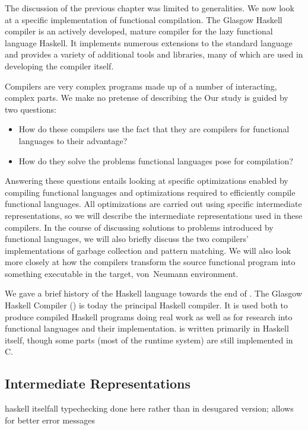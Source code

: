 \label{casestudy}
The discussion of the previous chapter was limited to generalities. We now look at a specific implementation of functional compilation. The Glasgow Haskell compiler is an actively developed, mature compiler for the lazy functional language Haskell. It implements numerous extensions to the standard language and provides a variety of additional tools and libraries, many of which are used in developing the compiler itself.

Compilers are very complex programs made up of a number of interacting, complex parts. We make no pretense of describing the \GHC[long]  Our study is guided by two questions:
\begin{itemize}
\item
How do these compilers use the fact that they are compilers for functional languages to their advantage?

\item
How do they solve the problems functional languages pose for compilation?
\end{itemize}

Answering these questions entails looking at specific optimizations enabled by compiling functional languages and optimizations required to efficiently compile functional languages. All optimizations are carried out using specific intermediate representations, so we will describe the intermediate representations used in these compilers. In the course of discussing solutions to problems introduced by functional languages, we will also briefly discuss the two compilers' implementations of garbage collection and pattern matching. We will also look more closely at how the compilers transform the source functional program into something executable in the target, von~Neumann environment.

We gave a brief history of the Haskell language towards the end of . The Glasgow Haskell Compiler (\GHC{}) is today the principal Haskell compiler. It is used both to produce compiled Haskell programs doing real work as well as for research into functional languages and their implementation. \GHC is written primarily in Haskell itself, though some parts (most of the runtime system) are still implemented in C.

\subsection{Intermediate Representations}
haskell itself\empause all typechecking done here rather than in desugared version; allows for better error messages

